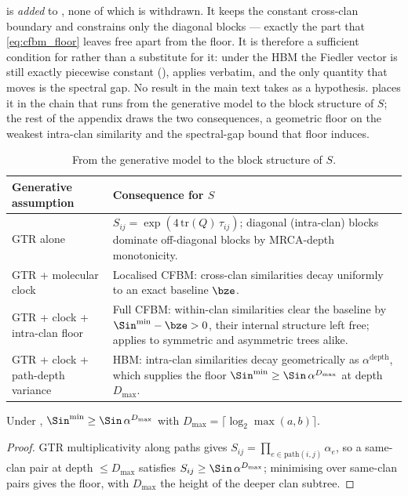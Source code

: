  is \emph{added} to , none
of which is withdrawn. It keeps the constant cross-clan boundary and constrains only
the diagonal blocks --- exactly the part that \eqref{eq:cfbm_floor} leaves free apart
from the floor. It is therefore a sufficient condition for  rather
than a substitute for it: under the HBM the Fiedler vector is still exactly
piecewise constant (),  applies verbatim, and
the only quantity that moves is the spectral gap. No result in the main text takes
 as a hypothesis.  places it in the chain
that runs from the generative model to the block structure of $S$; the rest of the
appendix draws the two consequences, a geometric floor on the weakest intra-clan
similarity and the spectral-gap bound that floor induces.

\begin{table}[htbp]
\centering\footnotesize\renewcommand{\arraystretch}{1.2}
\begin{tabular}{@{}p{} p{}@{}}
\toprule
\textbf{Generative assumption} & \textbf{Consequence for $S$} \\
\midrule
GTR alone & $S_{ij}=\exp(4\,\mathrm{tr}(Q)\,\tau_{ij})$; diagonal (intra-clan)
blocks dominate off-diagonal blocks by MRCA-depth monotonicity. \\
\addlinespace
GTR + molecular clock & Localised CFBM: cross-clan similarities decay uniformly to
an exact baseline $\bze$. \\
\addlinespace
GTR + clock + intra-clan floor & Full CFBM: within-clan similarities clear the
baseline by $\Sin^{\min}-\bze>0$, their internal structure left free; applies to
symmetric and asymmetric trees alike. \\
\addlinespace
GTR + clock + path-depth variance & HBM: intra-clan similarities decay
geometrically as $\alpha^{\mathrm{depth}}$, which supplies the floor
$\Sin^{\min}\ge\Sin\,\alpha^{D_{\max}}$ at depth $D_{\max}$. \\
\bottomrule
\end{tabular}
\caption{From the generative model to the block structure of $S$.}
\label{tab:assumption_chain}
\end{table}

\begin{proposition}\label{prop:D-floor}
Under , $\Sin^{\min}\ge\Sin\,\alpha^{D_{\max}}$ with
$D_{\max}=\lceil\log_2\max(a,b)\rceil$.
\end{proposition}
\begin{proof}
GTR multiplicativity along paths gives
$S_{ij}=\prod_{e\in\mathrm{path}(i,j)}\alpha_e$, so a same-clan pair at depth
$\le D_{\max}$ satisfies $S_{ij}\ge\Sin\,\alpha^{D_{\max}}$; minimising over
same-clan pairs gives the floor, with $D_{\max}$ the height of the deeper clan
subtree.
\end{proof}

